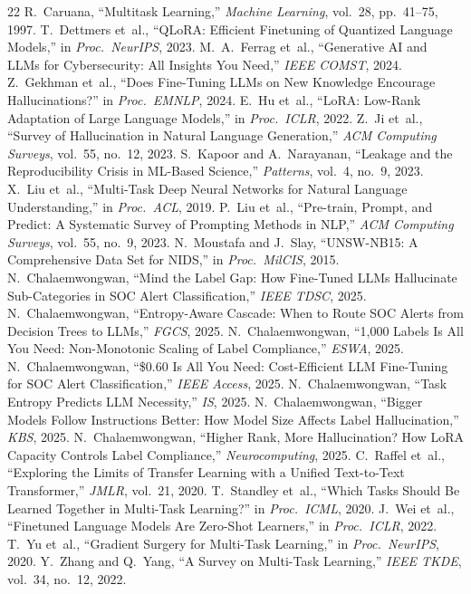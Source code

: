\documentclass[review,3p]{elsarticle}
\begin{document}
\begin{thebibliography}{22}
 R.~Caruana, ``Multitask Learning,'' \emph{Machine Learning}, vol.~28, pp.~41--75, 1997.
 T.~Dettmers et~al., ``QLoRA: Efficient Finetuning of Quantized Language Models,'' in \emph{Proc.\ NeurIPS}, 2023.
 M.~A.~Ferrag et~al., ``Generative AI and LLMs for Cybersecurity: All Insights You Need,'' \emph{IEEE COMST}, 2024.
 Z.~Gekhman et~al., ``Does Fine-Tuning LLMs on New Knowledge Encourage Hallucinations?'' in \emph{Proc.\ EMNLP}, 2024.
 E.~Hu et~al., ``LoRA: Low-Rank Adaptation of Large Language Models,'' in \emph{Proc.\ ICLR}, 2022.
 Z.~Ji et~al., ``Survey of Hallucination in Natural Language Generation,'' \emph{ACM Computing Surveys}, vol.~55, no.~12, 2023.
 S.~Kapoor and A.~Narayanan, ``Leakage and the Reproducibility Crisis in ML-Based Science,'' \emph{Patterns}, vol.~4, no.~9, 2023.
 X.~Liu et~al., ``Multi-Task Deep Neural Networks for Natural Language Understanding,'' in \emph{Proc.\ ACL}, 2019.
 P.~Liu et~al., ``Pre-train, Prompt, and Predict: A Systematic Survey of Prompting Methods in NLP,'' \emph{ACM Computing Surveys}, vol.~55, no.~9, 2023.
 N.~Moustafa and J.~Slay, ``UNSW-NB15: A Comprehensive Data Set for NIDS,'' in \emph{Proc.\ MilCIS}, 2015.
 N.~Chalaemwongwan, ``Mind the Label Gap: How Fine-Tuned LLMs Hallucinate Sub-Categories in SOC Alert Classification,'' \emph{IEEE TDSC}, 2025.
 N.~Chalaemwongwan, ``Entropy-Aware Cascade: When to Route SOC Alerts from Decision Trees to LLMs,'' \emph{FGCS}, 2025.
 N.~Chalaemwongwan, ``1,000 Labels Is All You Need: Non-Monotonic Scaling of Label Compliance,'' \emph{ESWA}, 2025.
 N.~Chalaemwongwan, ``\$0.60 Is All You Need: Cost-Efficient LLM Fine-Tuning for SOC Alert Classification,'' \emph{IEEE Access}, 2025.
 N.~Chalaemwongwan, ``Task Entropy Predicts LLM Necessity,'' \emph{IS}, 2025.
 N.~Chalaemwongwan, ``Bigger Models Follow Instructions Better: How Model Size Affects Label Hallucination,'' \emph{KBS}, 2025.
 N.~Chalaemwongwan, ``Higher Rank, More Hallucination? How LoRA Capacity Controls Label Compliance,'' \emph{Neurocomputing}, 2025.
 C.~Raffel et~al., ``Exploring the Limits of Transfer Learning with a Unified Text-to-Text Transformer,'' \emph{JMLR}, vol.~21, 2020.
 T.~Standley et~al., ``Which Tasks Should Be Learned Together in Multi-Task Learning?'' in \emph{Proc.\ ICML}, 2020.
 J.~Wei et~al., ``Finetuned Language Models Are Zero-Shot Learners,'' in \emph{Proc.\ ICLR}, 2022.
 T.~Yu et~al., ``Gradient Surgery for Multi-Task Learning,'' in \emph{Proc.\ NeurIPS}, 2020.
 Y.~Zhang and Q.~Yang, ``A Survey on Multi-Task Learning,'' \emph{IEEE TKDE}, vol.~34, no.~12, 2022.
\end{thebibliography}
\end{document}
